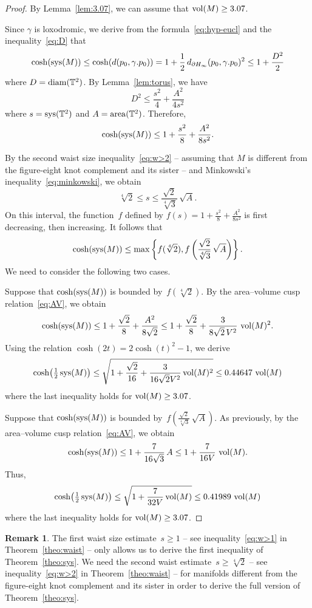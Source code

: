 \documentclass[11pt,reqno]{amsart}
\theoremstyle{definition}
\newtheorem{remark}[theorem]{Remark}
\numberwithin{equation}{section}
\newcommand\T {{\mathbb T}}
\DeclareMathOperator{\area}{{\rm area}}
\DeclareMathOperator{\vol}{{\rm vol}}
\DeclareMathOperator{\sys}{{\rm sys}}
\DeclareMathOperator{\diam}{{\rm diam}}
\numberwithin{equation}{section}
\begin{document}
\begin{proof}
By Lemma~\ref{lem:3.07}, we can assume that $\vol(M) \geq 3.07$.

Since $\gamma$ is loxodromic, we derive from the formula~\eqref{eq:hyp-eucl} and the inequality~\eqref{eq:D} that
\[
\cosh( \sys(M) ) \leq \cosh( d(p_0,\gamma .p_0)) = 1+\frac{1}{2} \, d_{\partial H_\infty}(p_0,\gamma .p_0)^2 \leq 1 + \frac{D^2}{2}
\]
where $D=\diam(\T^2)$.
By Lemma~\ref{lem:torus}, we have
\[
D^2 \leq \frac{s^2}{4} + \frac{A^2}{4 s^2}
\]
where $s=\sys(\T^2)$ and $A=\area(\T^2)$.
Therefore, 
\[
\cosh( \sys(M) ) \leq 1+\frac{s^2}{8} + \frac{A^2}{8s^2}.
\]

By the second waist size inequality~\eqref{eq:w>2} -- assuming that $M$ is different from the figure-eight knot complement and its sister -- and Minkowski's inequality~\eqref{eq:minkowski}, we obtain
\[
\sqrt[4]{2} \leq s \leq \frac{\sqrt{2}}{\sqrt[4]{3}} \, \sqrt{A}.
\]
On this interval, the function~$f$ defined by $f(s) = 1+\frac{s^2}{8} + \frac{A^2}{8s^2}$ is first decreasing, then increasing.
It follows that 
\[
\cosh( \sys(M) ) \leq \max \left\{ f(\sqrt[4]{2}), f\left(\frac{\sqrt{2}}{\sqrt[4]{3}} \, \sqrt{A} \right) \right\}.
\]
We need to consider the following two cases.

Suppose that $\cosh( \sys(M) )$ is bounded by~$f(\sqrt[4]{2})$.
By the area--volume cusp relation~\eqref{eq:AV}, we obtain
\[
\cosh( \sys(M) ) \leq 1 + \frac{\sqrt{2}}{8} + \frac{A^2}{8 \sqrt{2}} \leq 1 + \frac{\sqrt{2}}{8} + \frac{3}{8 \sqrt{2} \, V^2} \, \vol(M)^2.
\]
Using the relation $\cosh(2t)=2 \cosh(t)^2-1$, we derive 
\[
\cosh \!\left(\tfrac{1}{2} \sys(M) \right) \leq \sqrt{1 + \frac{\sqrt{2}}{16} + \frac{3}{16 \sqrt{2} V^2} \vol(M)^2} \leq 0.44647 \, \vol(M)
\]
where the last inequality holds for $\vol(M) \geq 3.07$.

Suppose that $\cosh( \sys(M) )$ is bounded by~$f\left(\frac{\sqrt{2}}{\sqrt[4]{3}} \, \sqrt{A} \right)$.
As previously, by the area--volume cusp relation~\eqref{eq:AV}, we obtain
\[
\cosh( \sys(M) ) \leq 1 + \frac{7}{16 \sqrt{3}} \, A \leq 1 + \frac{7}{16 V} \, \vol(M).
\]
Thus,
\[
\cosh \!\left(\tfrac{1}{2} \sys(M) \right) \leq \sqrt{1 + \frac{7}{32 V} \vol(M)} \leq 0.41989 \, \vol(M)
\]
where the last inequality holds for $\vol(M) \geq 3.07$.
\end{proof}



\begin{remark}
The first waist size estimate~$s \geq 1$ -- see inequality~\eqref{eq:w>1} in Theorem~\ref{theo:waist} -- only allows us to derive the first inequality of Theorem~\ref{theo:sys}.
We need the second waist estimate~$s \geq \sqrt[4]{2}$ -- see inequality~\eqref{eq:w>2} in Theorem~\ref{theo:waist} -- for manifolds different from the figure-eight knot complement and its sister in order to derive the full version of Theorem~\ref{theo:sys}.
\end{remark}
\end{document}
